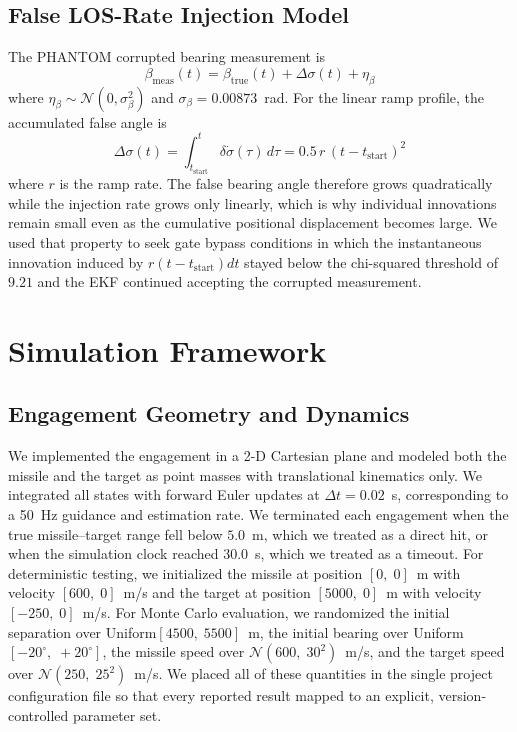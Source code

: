 \documentclass[journal]{IEEEtran}
\begin{document}
\subsection{False LOS-Rate Injection Model}
The PHANTOM corrupted bearing measurement is
\begin{equation}
  \beta_{\mathrm{meas}}(t)
  = \beta_{\mathrm{true}}(t) + \Delta\sigma(t) + \eta_\beta
  \label{eq:injection}
\end{equation}
where $\eta_\beta \sim \mathcal{N}(0,\sigma_\beta^2)$ and
$\sigma_\beta = 0.00873$~rad.  For the linear ramp profile, the
accumulated false angle is
\begin{equation}
  \Delta\sigma(t)
  = \int_{t_{\mathrm{start}}}^{t} \delta\dot{\sigma}(\tau)\,d\tau
  = 0.5\, r\, (t - t_{\mathrm{start}})^2
  \label{eq:false_angle}
\end{equation}
where $r$ is the ramp rate.  The false bearing angle therefore grows
quadratically while the injection rate grows only linearly, which is
why individual innovations remain small even as the cumulative
positional displacement becomes large.  We used that property to seek
gate bypass conditions in which the instantaneous innovation induced
by $r (t - t_{\mathrm{start}}) dt$ stayed below the chi-squared
threshold of $9.21$ and the EKF continued accepting the corrupted
measurement.

\section{Simulation Framework}
\label{sec:simulation}

\subsection{Engagement Geometry and Dynamics}
We implemented the engagement in a 2-D Cartesian plane and modeled
both the missile and the target as point masses with translational
kinematics only.  We integrated all states with forward Euler updates
at $\Delta t = 0.02$~s, corresponding to a 50~Hz guidance and
estimation rate.  We terminated each engagement when the true
missile--target range fell below $5.0$~m, which we treated as a
direct hit, or when the simulation clock reached $30.0$~s, which we
treated as a timeout.  For deterministic testing, we initialized the
missile at position $[0,\;0]$~m with velocity $[600,\;0]$~m/s and the
target at position $[5000,\;0]$~m with velocity $[-250,\;0]$~m/s.
For Monte Carlo evaluation, we randomized the initial separation over
Uniform$[4500,\;5500]$~m, the initial bearing over
Uniform$[-20^\circ,\;+20^\circ]$, the missile speed over
$\mathcal{N}(600,\;30^2)$~m/s, and the target speed over
$\mathcal{N}(250,\;25^2)$~m/s.  We placed all of these quantities in
the single project configuration file so that every reported result
mapped to an explicit, version-controlled parameter set.
\end{document}

